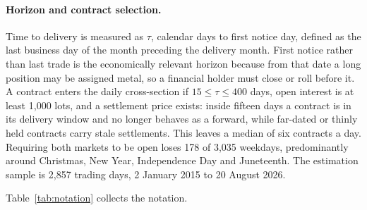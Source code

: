 \documentclass[11pt,a4paper]{article}
\begin{document}
\paragraph{Horizon and contract selection.}
Time to delivery is measured as $\tau$, calendar days to first notice day,
defined as the last business day of the month preceding the delivery month.
First notice rather than last trade is the economically relevant horizon
because from that date a long position may be assigned metal, so a financial
holder must close or roll before it. A contract enters the daily cross-section
if $15\le\tau\le400$ days, open interest is at least 1{,}000 lots, and a
settlement price exists: inside fifteen days a contract is in its delivery
window and no longer behaves as a forward, while far-dated or thinly held
contracts carry stale settlements. This leaves a median of six contracts a day.
Requiring both markets to be open loses 178 of 3{,}035 weekdays, predominantly
around Christmas, New Year, Independence Day and Juneteenth. The estimation
sample is 2{,}857 trading days, 2 January 2015 to 20 August 2026.

Table~\ref{tab:notation} collects the notation.
\end{document}
